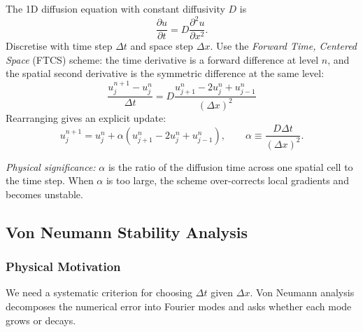 The 1D diffusion equation with constant diffusivity $D$ is
\begin{equation}
  \frac{\partial u}{\partial t}
  = D\frac{\partial^2 u}{\partial x^2}.
  \label{eq:lec09:diffusion}
\end{equation}
Discretise with time step $\Delta t$ and space step $\Delta x$.
Use the \emph{Forward Time, Centered Space} (FTCS) scheme: the time
derivative is a forward difference at level $n$, and the spatial
second derivative is the symmetric difference at the same level:
\begin{equation}
  \boxed{
  \frac{u_j^{n+1}-u_j^{n}}{\Delta t}
  = D\frac{u_{j+1}^{n}-2u_j^{n}+u_{j-1}^{n}}{(\Delta x)^2}}
  \label{eq:lec09:ftcs}
\end{equation}
Rearranging gives an explicit update:
\begin{equation}
  u_j^{n+1}
  = u_j^{n}
  + \alpha\!\left(u_{j+1}^{n}-2u_j^{n}+u_{j-1}^{n}\right),
  \qquad
  \alpha \equiv \frac{D\Delta t}{(\Delta x)^2}.
  \label{eq:lec09:ftcs-explicit}
\end{equation}

\textit{Physical significance:} $\alpha$ is the ratio of the diffusion
time across one spatial cell to the time step.  When $\alpha$ is too
large, the scheme over-corrects local gradients and becomes unstable.

\subsection{Von Neumann Stability Analysis}\label{subsec:lec09:vn}

\subsubsection*{Physical Motivation}
We need a systematic criterion for choosing $\Delta t$ given $\Delta x$.
Von Neumann analysis decomposes the numerical error into Fourier modes
and asks whether each mode grows or decays.

